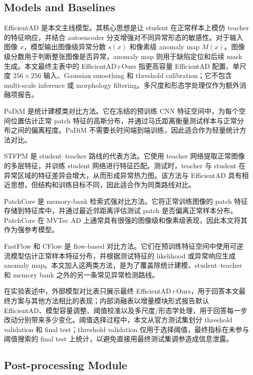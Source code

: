 \documentclass[letterpaper]{article}
\newcommand{\method}{EfficientAD+Ours}
\begin{document}
\subsection{Models and Baselines}

EfficientAD 是本文主线模型。其核心思想是让 student 在正常样本上模仿 teacher 的特征响应，并结合 autoencoder 分支增强对不同异常形态的敏感性。对于输入图像 \(x\)，模型输出图像级异常分数 \(s(x)\) 和像素级 anomaly map \(M(x)\)。图像级分数用于判断整张图像是否异常，anomaly map 则用于缺陷定位和后续 mask 生成。本文最终主表中的 \method{} 指更高容量 EfficientAD 配置、单尺度 \(256\times256\) 输入、Gaussian smoothing 和 threshold calibration；它不包含 multi-scale inference 或 morphology filtering。多尺度和形态学处理仅作为额外消融项报告。

PaDiM 是统计建模类对比方法。它在冻结的预训练 CNN 特征空间中，为每个空间位置估计正常 patch 特征的高斯分布，并通过马氏距离衡量测试样本与正常分布之间的偏离程度。PaDiM 不需要长时间端到端训练，因此适合作为轻量统计方法对比。

STFPM 是 student--teacher 路线的代表方法。它使用 teacher 网络提取正常图像的多层特征，并训练 student 网络进行特征匹配。测试时，teacher 与 student 在异常区域的特征差异会增大，从而形成异常热力图。该方法与 EfficientAD 具有相近思想，但结构和训练目标不同，因此适合作为同类路线对比。

PatchCore 是 memory-bank 检索式强对比方法。它将正常训练图像的 patch 特征存储到特征库中，并通过最近邻距离评估测试 patch 是否偏离正常样本分布。PatchCore 在 MVTec AD 上通常具有很强的图像级和像素级表现，因此本文将其作为强参考模型。

FastFlow 和 CFlow 是 flow-based 对比方法。它们在预训练特征空间中使用可逆流模型估计正常样本特征分布，并根据测试特征的 likelihood 或异常响应生成 anomaly map。本文加入这两类方法，是为了覆盖除统计建模、student--teacher 和 memory bank 之外的另一条常见异常检测路线。

在实验表述中，外部模型对比表只展示最终 \method{}，用于回答本文最终方案与其他方法相比的表现；内部消融表以增量模块形式报告默认 EfficientAD、模型容量调整、阈值校准以及多尺度/形态学处理，用于回答每一步改动分别带来多少变化。阈值选择过程中，本文从官方测试集划分 threshold validation 和 final test；threshold validation 仅用于选择阈值，最终指标在未参与阈值搜索的 final test 上统计，以避免直接用最终测试集调参造成信息泄露。

\subsection{Post-processing Module}
\end{document}

